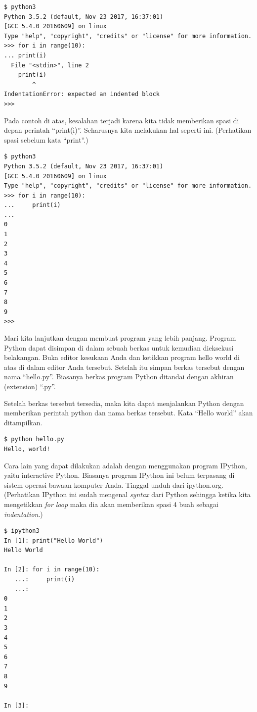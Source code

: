 \begin{verbatim}
$ python3
Python 3.5.2 (default, Nov 23 2017, 16:37:01) 
[GCC 5.4.0 20160609] on linux
Type "help", "copyright", "credits" or "license" for more information.
>>> for i in range(10):
... print(i)
  File "<stdin>", line 2
    print(i)
        ^
IndentationError: expected an indented block
>>> 
\end{verbatim}

Pada contoh di atas, kesalahan terjadi karena kita tidak memberikan spasi di
depan perintah ``print(i)''. Seharusnya kita melakukan hal seperti ini.
(Perhatikan spasi sebelum kata ``print''.)

\begin{verbatim}
$ python3
Python 3.5.2 (default, Nov 23 2017, 16:37:01) 
[GCC 5.4.0 20160609] on linux
Type "help", "copyright", "credits" or "license" for more information.
>>> for i in range(10):
...     print(i)
... 
0
1
2
3
4
5
6
7
8
9
>>> 
\end{verbatim}


Mari kita lanjutkan dengan membuat program yang lebih panjang. Program Python
dapat disimpan di dalam sebuah berkas untuk kemudian dieksekusi belakangan.
Buka editor kesukaan Anda dan ketikkan program hello world di atas di dalam
editor Anda tersebut. Setelah itu simpan berkas tersebut dengan nama
``hello.py''. Biasanya berkas program Python ditandai dengan akhiran
(extension) ``.py''.

Setelah berkas tersebut tersedia, maka kita dapat menjalankan Python dengan
memberikan perintah python dan nama berkas tersebut. 
Kata ``Hello world'' akan ditampilkan.

\begin{verbatim}
$ python hello.py
Hello, world!
\end{verbatim}

Cara lain yang dapat dilakukan adalah dengan menggunakan program IPython,
yaitu interactive Python. Biasanya program IPython ini belum terpasang di
sistem operasi bawaan komputer Anda. Tinggal unduh dari ipython.org.
(Perhatikan IPython ini sudah mengenal {\em syntax} dari Python sehingga 
ketika kita mengetikkan {\em for loop} maka dia akan memberikan spasi 4 buah
sebagai {\em indentation}.)

\begin{verbatim}
$ ipython3
In [1]: print("Hello World")
Hello World

In [2]: for i in range(10):
   ...:     print(i)
   ...:     
0
1
2
3
4
5
6
7
8
9

In [3]: 
\end{verbatim}

